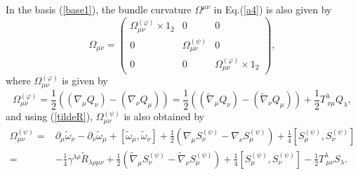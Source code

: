 \documentclass{ptephy}%
\begin{document}
In the basis (\ref{base1}), the bundle curvature $\Omega^{\mu\nu}$ in Eq.(\ref{a4}) is also given by 
\begin{equation}
\Omega_{\mu\nu} =
\begin{pmatrix}
\Omega_{\mu\nu}^{(\varphi)}\times 1_2 & 0 & 0\\
0 & \Omega_{\mu\nu}^{(\psi)} & 0\\
0 & 0 & \Omega_{\mu\nu}^{(\varphi)}\times 1_2
\end{pmatrix}, \label{Omega}
\end{equation}
where $\Omega_{\mu\nu}^{(\varphi)}$ is given by %
\begin{equation}
\Omega_{\mu\nu}^{(\varphi)} =  
\frac{1}{2}((\nabla_\mu Q_\nu)-(\nabla_\nu Q_\mu))
= 
\frac{1}{2}((\tilde{\nabla}_\mu Q_\nu) -(\tilde{\nabla}_\nu Q_\mu)) +\frac{1}{2}T^\lambda_{\ \nu\mu}Q_\lambda, 
\label{Omegaphi}
\end{equation}
and using (\ref{tildeR}), $\Omega_{\mu\nu}^{(\psi)}$ is also obtained by
\begin{align} 
\Omega_{\mu\nu}^{(\psi)} = &
\partial_\mu\tilde{\omega}_\nu-\partial_\nu\tilde{\omega}_\mu+
[\tilde{\omega}_\mu,\tilde{\omega}_\nu]+\frac{1}{2}(\nabla_\mu S^{(\psi)}_\nu-\nabla_\nu S^{(\psi)}_\mu)
+\frac{1}{4}[S_\mu^{(\psi)},S^{(\psi)}_\nu] \nonumber \\
= & -\frac{1}{4}\gamma^{\lambda\rho}\tilde{R}_{\lambda\rho\mu\nu}
+\frac{1}{2}(\tilde{\nabla}_\mu S^{(\psi)}_\nu-\tilde{\nabla}_\nu S^{(\psi)}_\mu)
+\frac{1}{4}[S_\mu^{(\psi)},S^{(\psi)}_\nu]-\frac{1}{2}T^\lambda_{\ \mu\nu}S_\lambda \label{Omegapsi}.
\end{align}
\end{document}
